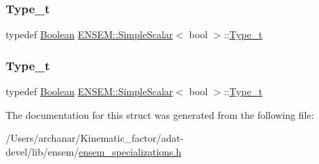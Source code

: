 \mbox{\label{structENSEM_1_1SimpleScalar_3_01bool_01_4_a1857cdcebad8e9a51ea6bf7234faf05d}} 
\subsubsection{\texorpdfstring{Type\_t}{Type\_t}\hspace{0.1cm}{\footnotesize\ttfamily [2/3]}}
{\footnotesize\ttfamily typedef \mbox{\hyperlink{group__defs_ga38f0cd64d26e121e75367986f2d7cd6c}{Boolean}} \mbox{\hyperlink{structENSEM_1_1SimpleScalar}{E\+N\+S\+E\+M\+::\+Simple\+Scalar}}$<$ bool $>$\+::\mbox{\hyperlink{structENSEM_1_1SimpleScalar_3_01bool_01_4_a1857cdcebad8e9a51ea6bf7234faf05d}{Type\+\_\+t}}}

\mbox{\label{structENSEM_1_1SimpleScalar_3_01bool_01_4_a1857cdcebad8e9a51ea6bf7234faf05d}} 
\subsubsection{\texorpdfstring{Type\_t}{Type\_t}\hspace{0.1cm}{\footnotesize\ttfamily [3/3]}}
{\footnotesize\ttfamily typedef \mbox{\hyperlink{group__defs_ga38f0cd64d26e121e75367986f2d7cd6c}{Boolean}} \mbox{\hyperlink{structENSEM_1_1SimpleScalar}{E\+N\+S\+E\+M\+::\+Simple\+Scalar}}$<$ bool $>$\+::\mbox{\hyperlink{structENSEM_1_1SimpleScalar_3_01bool_01_4_a1857cdcebad8e9a51ea6bf7234faf05d}{Type\+\_\+t}}}



The documentation for this struct was generated from the following file\+:\begin{DoxyCompactItemize}
\item 
/\+Users/archanar/\+Kinematic\+\_\+factor/adat-\/devel/lib/ensem/\mbox{\hyperlink{adat-devel_2lib_2ensem_2ensem__specializations_8h}{ensem\+\_\+specializations.\+h}}\end{DoxyCompactItemize}
